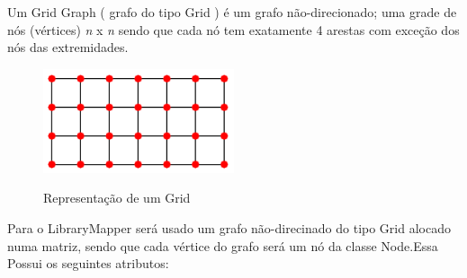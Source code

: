 \documentclass[a4paper,10pt]{article}
\begin{document}
      Um Grid Graph ( grafo do tipo Grid ) é um grafo não-direcionado; uma grade de nós (vértices) \textit{n} x \textit{n} sendo que cada
      nó tem exatamente 4 arestas com exceção dos nós das extremidades.
       \begin{figure}[H]
	\centering
      \includegraphics[width=0.5\textwidth]{./imgs/grid.png}\\[1cm]
	\caption{Representação de um Grid}
      \end{figure}
      Para o LibraryMapper será usado um grafo não-direcinado do tipo Grid alocado numa matriz, sendo que cada vértice do grafo 
      será um nó da classe Node.Essa Possui os seguintes atributos:\\
      
\end{document}
